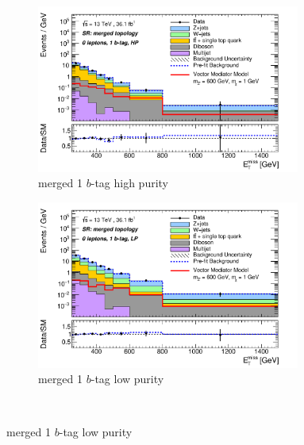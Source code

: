 \begin{figure}[htbp]
  \begin{subfigure}{0.49\textwidth}
    \centering
    \includegraphics[width=0.95\textwidth]{figures/monoV/postfit/monoV_0lep_1tag_merged_substrPass_massPass_met_XS.pdf}
    \caption{merged 1 \(b\)-tag high purity}
  \end{subfigure}
  \begin{subfigure}{0.49\textwidth}
    \centering
    \includegraphics[width=0.95\textwidth]{figures/monoV/postfit/monoV_0lep_1tag_merged_substrFail_massPass_met_XS.pdf}
    \caption{merged 1 \(b\)-tag low purity}
  \end{subfigure} \\


\end{figure}
